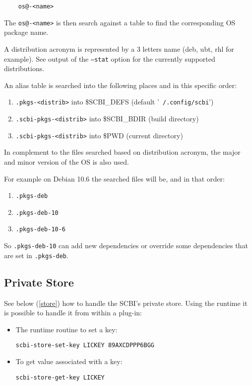 \documentclass[a4paper,12pt,twoside]{article}
\newcommand{\code}[1]{\texttt{#1}}
\newcommand{\file}[1]{'{\texttt{#1}}'}
\begin{document}
\begin{lstlisting}
	os@-<name>
\end{lstlisting}

The \code{os@-<name>} is then search against a table to find the corresponding OS package name.

A distribution acronym is represented by a 3 letters name (deb, ubt, rhl for example). See output of the \code{--stat} option for the currently supported distributions.

An alias table is searched into the following places and in this specific order:

\begin{enumerate}
	\item \code{.pkgs-<distrib>} into \$SCBI\_DEFS (default \file{~/.config/scbi})
	\item \code{.scbi-pkgs-<distrib>} into \$SCBI\_BDIR (build directory)
	\item \code{.scbi-pkgs-<distrib>} into \$PWD (current directory)
\end{enumerate}

In complement to the files searched based on distribution acronym, the major and minor version of the OS is also used.

For example on Debian 10.6 the searched files will be, and in that order:

\begin{enumerate}
	\item \code{.pkgs-deb}
	\item \code{.pkgs-deb-10}
	\item \code{.pkgs-deb-10-6}
\end{enumerate}

So \code{.pkgs-deb-10} can add new dependencies or override some dependencies that are set in \code{.pkgs-deb}.

\subsection{Private Store}

See below (\ref{store}) how to handle the SCBI's private store. Using the runtime it is possible to handle it from within a plug-in:

\begin{itemize}
	\item The runtime routine to set a key:

	\hspace{1.5cm}\texttt{scbi-store-set-key LICKEY 89AXCDPPP6BGG}

	\item To get value associated with a key:

	\hspace{1.5cm}\texttt{scbi-store-get-key LICKEY}
\end{itemize}
\end{document}
